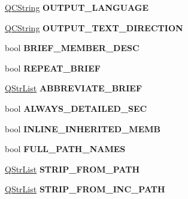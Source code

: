 \begin{DoxyCompactItemize}
\mbox{\hyperlink{class_q_c_string}{Q\+C\+String}} {\bfseries O\+U\+T\+P\+U\+T\+\_\+\+L\+A\+N\+G\+U\+A\+GE}
\item 
\mbox{\label{class_config_values_a65c6bf06ad41897e3dbf2ff2a2fef10a}} 
\mbox{\hyperlink{class_q_c_string}{Q\+C\+String}} {\bfseries O\+U\+T\+P\+U\+T\+\_\+\+T\+E\+X\+T\+\_\+\+D\+I\+R\+E\+C\+T\+I\+ON}
\item 
\mbox{\label{class_config_values_a7abe16101152b40dbe9a4ed139d9f517}} 
bool {\bfseries B\+R\+I\+E\+F\+\_\+\+M\+E\+M\+B\+E\+R\+\_\+\+D\+E\+SC}
\item 
\mbox{\label{class_config_values_ae09d07166f0c2c207311659f38ca7f57}} 
bool {\bfseries R\+E\+P\+E\+A\+T\+\_\+\+B\+R\+I\+EF}
\item 
\mbox{\label{class_config_values_a91eacaacf81dd6f13751363bbd9a5aff}} 
\mbox{\hyperlink{class_q_str_list}{Q\+Str\+List}} {\bfseries A\+B\+B\+R\+E\+V\+I\+A\+T\+E\+\_\+\+B\+R\+I\+EF}
\item 
\mbox{\label{class_config_values_a80606f47ff443622ce31f38b6cf9eab8}} 
bool {\bfseries A\+L\+W\+A\+Y\+S\+\_\+\+D\+E\+T\+A\+I\+L\+E\+D\+\_\+\+S\+EC}
\item 
\mbox{\label{class_config_values_ae270c1419999cff6fa9be6c89d4f66f0}} 
bool {\bfseries I\+N\+L\+I\+N\+E\+\_\+\+I\+N\+H\+E\+R\+I\+T\+E\+D\+\_\+\+M\+E\+MB}
\item 
\mbox{\label{class_config_values_a4c809e7a18c578a0b90fc01dabe2e138}} 
bool {\bfseries F\+U\+L\+L\+\_\+\+P\+A\+T\+H\+\_\+\+N\+A\+M\+ES}
\item 
\mbox{\label{class_config_values_addf9c68725dfd488c2adec37cb11224f}} 
\mbox{\hyperlink{class_q_str_list}{Q\+Str\+List}} {\bfseries S\+T\+R\+I\+P\+\_\+\+F\+R\+O\+M\+\_\+\+P\+A\+TH}
\item 
\mbox{\label{class_config_values_aa97c728481e0d2b45ec64ef68007e0e8}} 
\mbox{\hyperlink{class_q_str_list}{Q\+Str\+List}} {\bfseries S\+T\+R\+I\+P\+\_\+\+F\+R\+O\+M\+\_\+\+I\+N\+C\+\_\+\+P\+A\+TH}
\item 

\end{DoxyCompactItemize}
